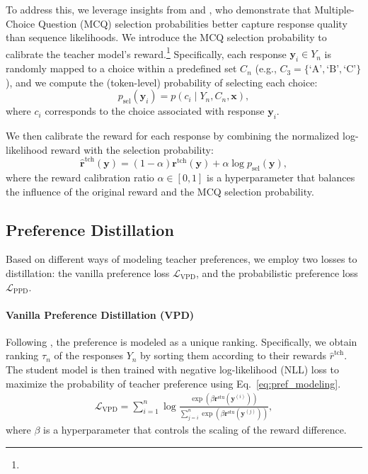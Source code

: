 To address this, we leverage insights from \citet{knowno2023} and \citet{pmlr-v239-ren23a}, who demonstrate that Multiple-Choice Question (MCQ) selection probabilities better capture response quality than sequence likelihoods. We introduce the MCQ selection probability to calibrate the teacher model's reward.\footnote{} Specifically, each response $\boldsymbol{y}_i \in Y_n$ is randomly mapped to a choice within a predefined set $C_n$ (e.g., $C_3 = \{\text{`A'}, \text{`B'}, \text{`C'}\}$), and we compute the (token-level) probability of selecting each choice:
\begin{equation}
\label{eq:select}
    p_{\text{sel}}(\boldsymbol{y}_i) = p(c_i \mid Y_n, C_n, \boldsymbol{x}),
\end{equation}
where $c_i$ corresponds to the choice associated with response $\boldsymbol{y}_i$.

We then calibrate the reward for each response by combining the normalized log-likelihood reward with the selection probability:
\begin{equation}
    \hat{\boldsymbol{r}}^{\text{tch}}(\boldsymbol{y}) = (1-\alpha) \boldsymbol{r}^{\text{tch}}(\boldsymbol{y}) + \alpha \log p_{\text{sel}}(\boldsymbol{y}),
\end{equation}
where the reward calibration ratio $\alpha \in [0,1]$ is a hyperparameter that balances the influence of the original reward and the MCQ selection probability.

\subsection{Preference Distillation}
\label{sec:phase-3}

Based on different ways of modeling teacher preferences, we employ two losses to distillation: the vanilla preference loss $\mathcal{L}_\text{VPD}$, and the probabilistic preference loss $\mathcal{L}_\text{PPD}$.

\paragraph{Vanilla Preference Distillation (VPD)}
Following \citet{rafailov-2023-direct, song-2024-pro}, the preference is modeled as a unique ranking. Specifically, we obtain ranking $\tau_n$ of the responses $Y_n$ by sorting them according to their rewards $\hat{r}^{\text{tch}}$. The student model is then trained with negative log-likelihood (NLL) loss to maximize the probability of teacher preference using Eq.~\ref{eq:pref_modeling}.
\begin{align}
    \mathcal{L}_\text{VPD} = \sum_{i=1}^n \log \frac{\exp\left( \beta \boldsymbol{r}^{\text{stu}}(\boldsymbol{y}^{(i)}) \right)}{\sum_{j=i}^n \exp\left( \beta\boldsymbol{r}^{\text{stu}}(\boldsymbol{y}^{(j)}) \right)},
\end{align}
where $\beta$ is a hyperparameter that controls the scaling of the reward difference.

